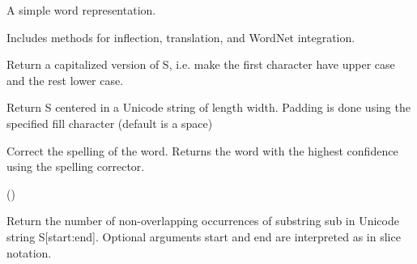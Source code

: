 \documentclass[letterpaper,10pt,english]{sphinxmanual}
\begin{document}
\begin{fulllineitems}
\label{api_reference:textblob_de.blob.Word}
A simple word representation.

Includes methods for inflection, translation, and WordNet
integration.

\begin{fulllineitems}
\label{api_reference:textblob_de.blob.Word.capitalize}
Return a capitalized version of S, i.e. make the first character
have upper case and the rest lower case.

\end{fulllineitems}


\begin{fulllineitems}
\label{api_reference:textblob_de.blob.Word.center}
Return S centered in a Unicode string of length width. Padding is
done using the specified fill character (default is a space)

\end{fulllineitems}


\begin{fulllineitems}
\label{api_reference:textblob_de.blob.Word.correct}
Correct the spelling of the word. Returns the word with the highest
confidence using the spelling corrector.

()

\end{fulllineitems}


\begin{fulllineitems}
\label{api_reference:textblob_de.blob.Word.count}
Return the number of non-overlapping occurrences of substring sub in
Unicode string S{[}start:end{]}.  Optional arguments start and end are
interpreted as in slice notation.


\end{fulllineitems}
\end{fulllineitems}
\end{document}
